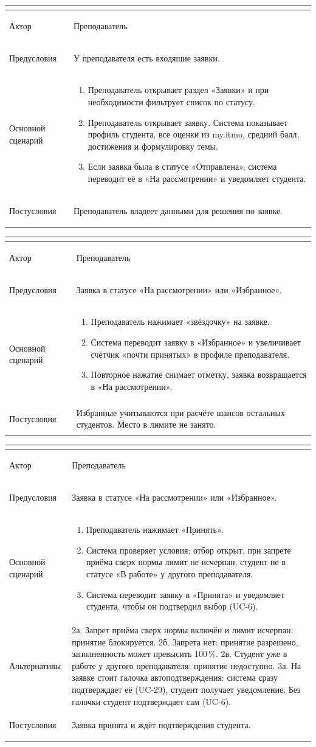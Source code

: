 \documentclass[a4paper,12pt]{article}
\newenvironment{ucd}[3]{%
  \needspace{10\baselineskip}
  \begin{longtable}{|>{\bfseries\raggedright\arraybackslash}p{3.0cm}|p{11.8cm}|}
  \hline
  \multicolumn{2}{|l|}{\textbf{#1.\ #2}}\\ \hline
  Актор & #3\\ \hline
}{\end{longtable}}
\newcommand{\steps}[1]{\begin{enumerate}[nosep,leftmargin=*]#1\end{enumerate}}
\begin{document}
\begin{ucd}{UC-14}{Просмотреть входящие заявки и профиль студента}{Преподаватель}
Предусловия & У преподавателя есть входящие заявки.\\ \hline
Основной сценарий & \steps{
 \item Преподаватель открывает раздел «Заявки» и при необходимости фильтрует список по статусу.
 \item Преподаватель открывает заявку. Система показывает профиль студента, все оценки из my.itmo, средний балл, достижения и формулировку темы.
 \item Если заявка была в статусе «Отправлена», система переводит её в «На рассмотрении» и уведомляет студента.}\\ \hline
Постусловия & Преподаватель владеет данными для решения по заявке.\\ \hline
\end{ucd}

\begin{ucd}{UC-15}{Отметить заявку избранной}{Преподаватель}
Предусловия & Заявка в статусе «На рассмотрении» или «Избранное».\\ \hline
Основной сценарий & \steps{
 \item Преподаватель нажимает «звёздочку» на заявке.
 \item Система переводит заявку в «Избранное» и увеличивает счётчик «почти принятых» в профиле преподавателя.
 \item Повторное нажатие снимает отметку, заявка возвращается в «На рассмотрении».}\\ \hline
Постусловия & Избранные учитываются при расчёте шансов остальных студентов. Место в лимите не занято.\\ \hline
\end{ucd}

\begin{ucd}{UC-16}{Принять заявку студента}{Преподаватель}
Предусловия & Заявка в статусе «На рассмотрении» или «Избранное».\\ \hline
Основной сценарий & \steps{
 \item Преподаватель нажимает «Принять».
 \item Система проверяет условия: отбор открыт, при запрете приёма сверх нормы лимит не исчерпан, студент не в статусе «В работе» у другого преподавателя.
 \item Система переводит заявку в «Принята» и уведомляет студента, чтобы он подтвердил выбор (UC-6).}\\ \hline
Альтернативы & 2а. Запрет приёма сверх нормы включён и лимит исчерпан: принятие блокируется.\newline
2б. Запрета нет: принятие разрешено, заполненность может превысить 100\,\%.\newline
2в. Студент уже в работе у другого преподавателя: принятие недоступно.\newline
3а. На заявке стоит галочка автоподтверждения: система сразу подтверждает её (UC-29), студент получает уведомление. Без галочки студент подтверждает сам (UC-6).\\ \hline
Постусловия & Заявка принята и ждёт подтверждения студента.\\ \hline
\end{ucd}
\end{document}
